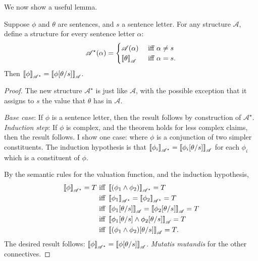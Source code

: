 We now show a useful lemma. \begin{lemma}[Substitution]\label{sublem}
	Suppose $\phi$ and $\theta$ are sentences, and $s$ a sentence letter. For any structure $\mathscr{A}$, define a structure for every sentence letter $\alpha$: $$\mathscr{A}^{\star}(\alpha) = \begin{cases} \mathscr{A}(\alpha) &\text{ iff } \alpha \neq s \\
	\left\llbracket \theta\right\rrbracket_{\mathscr{A}} &\text{ iff } \alpha = s.
		\end{cases}$$ Then $\left\llbracket \phi\right\rrbracket_{\mathscr{A^{\star}}}= \left\llbracket \phi[\theta/s]\right\rrbracket_{\mathscr{A}}$. 
\begin{proof}	The new structure $\mathscr{A}^{\star}$ is just like $\mathscr{A}$, with the possible exception that it assigns to $s$ the value that $\theta$ has in $\mathscr{A}$.

\emph{Base case}: If $\phi$ is a sentence letter, then the result follows by construction of $\mathscr{A}^{\star}$.\\
		\emph{Induction step}: If $\phi$ is complex, and the theorem holds for less complex claims, then the result follows. I show one case: where $\phi$ is a conjunction of two simpler constituents. The induction hypothesis is that  $\left\llbracket \phi_{i}\right\rrbracket_{\mathscr{A^{\star}}} = \left\llbracket \phi_{i}[\theta/s]\right\rrbracket_{\mathscr{A}}$ for each $\phi_{i}$ which is a constituent of $\phi$.

By the semantic rules for the valuation function, and the induction hypothesis, \begin{align*}
	\left\llbracket \phi\right\rrbracket_{\mathscr{A^{\star}}} = T &\text{ iff } \left\llbracket (\phi_{1} \wedge \phi_{2})\right\rrbracket_{\mathscr{A^{\star}}} = T\\ &\text{ iff } \left\llbracket \phi_{1}\right\rrbracket_{\mathscr{A^{\star}}}=\left\llbracket \phi_{2}\right\rrbracket_{\mathscr{A^{\star}}}=T\\ &\text{ iff } \left\llbracket \phi_{1}[\theta/s]\right\rrbracket_{\mathscr{A}}=\left\llbracket \phi_{2}[\theta/s]\right\rrbracket_{\mathscr{A}}=T\\ &\text{ iff } \left\llbracket \phi_{1}[\theta/s] \wedge \phi_{2}[\theta/s]\right\rrbracket_{\mathscr{A}}=T\\ &\text{ iff } \left\llbracket (\phi_{1} \wedge \phi_{2})[\theta/s]\right\rrbracket_{\mathscr{A}}=T.
\end{align*}
The desired result follows: $\left\llbracket \phi\right\rrbracket_{\mathscr{A^{\star}}} = \left\llbracket \phi[\theta/s]\right\rrbracket_{\mathscr{A}}$. \emph{Mutatis mutandis} for the other connectives. 
\end{proof} 
\end{lemma}



